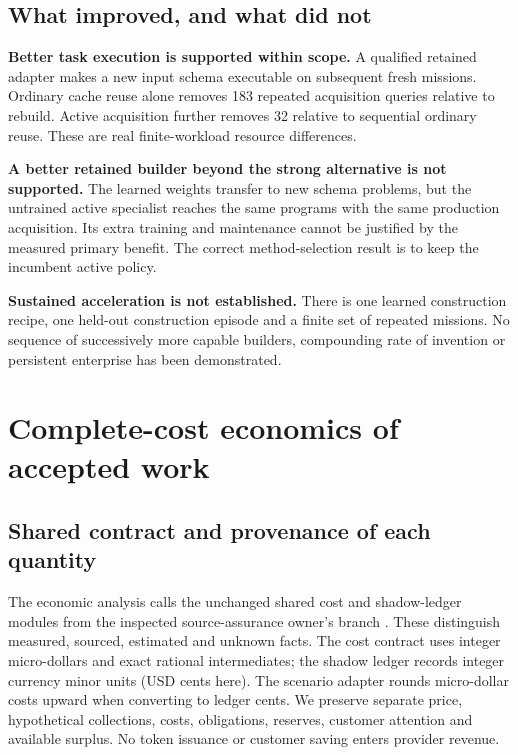 \documentclass[11pt,letterpaper]{article}
\begin{document}
\subsection{What improved, and what did not}

\textbf{Better task execution is supported within scope.} A qualified retained adapter makes a new input schema executable on subsequent fresh missions. Ordinary cache reuse alone removes 183 repeated acquisition queries relative to rebuild. Active acquisition further removes 32 relative to sequential ordinary reuse. These are real finite-workload resource differences.

\textbf{A better retained builder beyond the strong alternative is not supported.} The learned weights transfer to new schema problems, but the untrained active specialist reaches the same programs with the same production acquisition. Its extra training and maintenance cannot be justified by the measured primary benefit. The correct method-selection result is to keep the incumbent active policy.

\textbf{Sustained acceleration is not established.} There is one learned construction recipe, one held-out construction episode and a finite set of repeated missions. No sequence of successively more capable builders, compounding rate of invention or persistent enterprise has been demonstrated.

\section{Complete-cost economics of accepted work}
\label{sec:economics}

\subsection{Shared contract and provenance of each quantity}

The economic analysis calls the unchanged shared cost and shadow-ledger modules from the inspected source-assurance owner's branch \cite{costcontract}. These distinguish measured, sourced, estimated and unknown facts. The cost contract uses integer micro-dollars and exact rational intermediates; the shadow ledger records integer currency minor units (USD cents here). The scenario adapter rounds micro-dollar costs upward when converting to ledger cents. We preserve separate price, hypothetical collections, costs, obligations, reserves, customer attention and available surplus. No token issuance or customer saving enters provider revenue.
\end{document}
